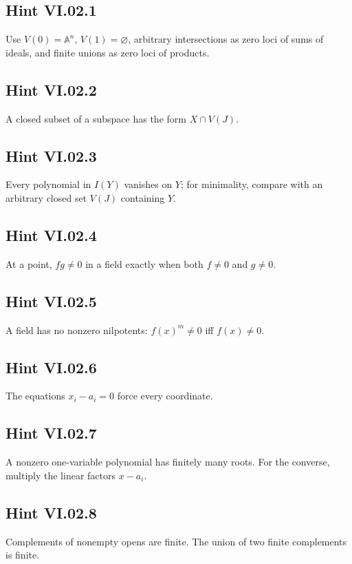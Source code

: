 
\subsection*{Hint VI.02.1}
Use \(V(0)=\mathbb A^n\), \(V(1)=\varnothing\), arbitrary intersections as zero loci of
sums of ideals, and finite unions as zero loci of products.

\subsection*{Hint VI.02.2}
A closed subset of a subspace has the form \(X\cap V(J)\).

\subsection*{Hint VI.02.3}
Every polynomial in \(I(Y)\) vanishes on \(Y\); for minimality, compare with an arbitrary
closed set \(V(J)\) containing \(Y\).

\subsection*{Hint VI.02.4}
At a point, \(fg\neq0\) in a field exactly when both \(f\neq0\) and \(g\neq0\).

\subsection*{Hint VI.02.5}
A field has no nonzero nilpotents: \(f(x)^m\neq0\) iff \(f(x)\neq0\).

\subsection*{Hint VI.02.6}
The equations \(x_i-a_i=0\) force every coordinate.

\subsection*{Hint VI.02.7}
A nonzero one-variable polynomial has finitely many roots.  For the converse, multiply the
linear factors \(x-a_i\).

\subsection*{Hint VI.02.8}
Complements of nonempty opens are finite.  The union of two finite complements is finite.

